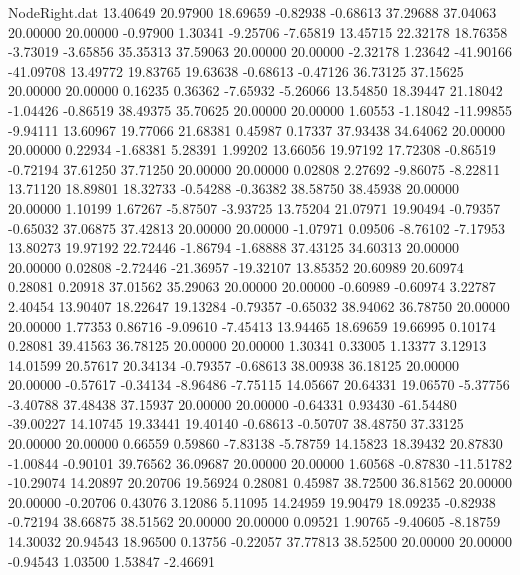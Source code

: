 \begin{filecontents}{NodeRight.dat}
  13.40649   20.97900   18.69659    -0.82938   -0.68613   37.29688   37.04063   20.00000   20.00000   -0.97900    1.30341   -9.25706   -7.65819
  13.45715   22.32178   18.76358    -3.73019   -3.65856   35.35313   37.59063   20.00000   20.00000   -2.32178    1.23642  -41.90166  -41.09708
  13.49772   19.83765   19.63638    -0.68613   -0.47126   36.73125   37.15625   20.00000   20.00000    0.16235    0.36362   -7.65932   -5.26066
  13.54850   18.39447   21.18042    -1.04426   -0.86519   38.49375   35.70625   20.00000   20.00000    1.60553   -1.18042  -11.99855   -9.94111
  13.60967   19.77066   21.68381     0.45987    0.17337   37.93438   34.64062   20.00000   20.00000    0.22934   -1.68381    5.28391    1.99202
  13.66056   19.97192   17.72308    -0.86519   -0.72194   37.61250   37.71250   20.00000   20.00000    0.02808    2.27692   -9.86075   -8.22811
  13.71120   18.89801   18.32733    -0.54288   -0.36382   38.58750   38.45938   20.00000   20.00000    1.10199    1.67267   -5.87507   -3.93725
  13.75204   21.07971   19.90494    -0.79357   -0.65032   37.06875   37.42813   20.00000   20.00000   -1.07971    0.09506   -8.76102   -7.17953
  13.80273   19.97192   22.72446    -1.86794   -1.68888   37.43125   34.60313   20.00000   20.00000    0.02808   -2.72446  -21.36957  -19.32107
  13.85352   20.60989   20.60974     0.28081    0.20918   37.01562   35.29063   20.00000   20.00000   -0.60989   -0.60974    3.22787    2.40454
  13.90407   18.22647   19.13284    -0.79357   -0.65032   38.94062   36.78750   20.00000   20.00000    1.77353    0.86716   -9.09610   -7.45413
  13.94465   18.69659   19.66995     0.10174    0.28081   39.41563   36.78125   20.00000   20.00000    1.30341    0.33005    1.13377    3.12913
  14.01599   20.57617   20.34134    -0.79357   -0.68613   38.00938   36.18125   20.00000   20.00000   -0.57617   -0.34134   -8.96486   -7.75115
  14.05667   20.64331   19.06570    -5.37756   -3.40788   37.48438   37.15937   20.00000   20.00000   -0.64331    0.93430  -61.54480  -39.00227
  14.10745   19.33441   19.40140    -0.68613   -0.50707   38.48750   37.33125   20.00000   20.00000    0.66559    0.59860   -7.83138   -5.78759
  14.15823   18.39432   20.87830    -1.00844   -0.90101   39.76562   36.09687   20.00000   20.00000    1.60568   -0.87830  -11.51782  -10.29074
  14.20897   20.20706   19.56924     0.28081    0.45987   38.72500   36.81562   20.00000   20.00000   -0.20706    0.43076    3.12086    5.11095
  14.24959   19.90479   18.09235    -0.82938   -0.72194   38.66875   38.51562   20.00000   20.00000    0.09521    1.90765   -9.40605   -8.18759
  14.30032   20.94543   18.96500     0.13756   -0.22057   37.77813   38.52500   20.00000   20.00000   -0.94543    1.03500    1.53847   -2.46691

\end{filecontents}
